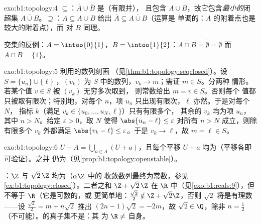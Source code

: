 \begin{solution}{exo:b1:topology:4}
$\subseteq$：$\overline A \cup \overline B$ 是（有限并），
且包含 $A \cup B$，故它包含\emph{最小的}闭
超集 $\overline{A \cup B}$。$\supseteq$：$A \subseteq A \cup B$
给出 $\overline A \subseteq \overline{A \cup B}$（运算是
单调的：$A$ 的附着点也是较大的附着点），而
对 $B$ 同理。

交集的反例：$A = \intoo{0}{1}$，$B =
\intoo{1}{2}$：$\overline{A \cap B} = \overline\emptyset = \emptyset$
而 $\overline A \cap \overline B = \{1\}$。
\end{solution}

\begin{solution}{exo:b1:topology:5}
利用的数列刻画
（见\cref{thm:b1:topology:seqclosed}）。设 $S = \{u_n\} \cup \{\ell\}$
，$(v_k)$ 为 $S$ 中的数列，$v_k \to m$；需证 $m \in S$。分两种
情形。若某个值 $v \in S$ 被 $(v_k)$ 无穷多次取到，
则常数给出 $m = v \in S$。否则每个
值都只被取有限次；特别地，对每个 $n$，项 $u_n$
只出现有限次，$\ell$ 亦然。于是对每个 $N$，
指标 $k$（满足 $v_k \in \{u_0, \dots, u_N, \ell\}$）只有有限多个，
其余的 $v_k$ 均为项 $u_n$，其中 $n > N$。给定
$\varepsilon > 0$，取 $N$ 使得 $\abs{u_n - \ell} \leq
\varepsilon$ 对所有 $n > N$ 成立，则除有限多个 $v_k$ 外都满足
$\abs{v_k - \ell} \leq \varepsilon$。于是 $v_k \to \ell$，故 $m =
\ell \in S$。
\end{solution}

\begin{solution}{exo:b1:topology:6}
$U + A = \bigcup_{a \in A} (U + a)$，且每个平移 $U + a$
均为（平移各即可验证）。之并
仍为（见\cref{prop:b1:topology:openstable}）。

：$\Z$ 与 $\sqrt 2\,\Z$ 均为（$\alpha\Z$ 中的
收敛数列最终为常数，参见
\cref{ex:b1:topology:closed}）。二者之和 $\Z + \sqrt 2\,\Z$ 在
$\R$ 中（见\cref{exo:b1:reals:9}），但不等于 $\R$（它是可数的，或
更简单地：$\frac{\sqrt 2}{2} \notin \Z + \sqrt2\Z$，否则 $\sqrt 2$
将是有理数——设 $\frac{\sqrt2}{2} = m + n\sqrt 2$
推出 $(2n - 1)\sqrt 2 = -2m$，故 $\sqrt 2 \in \Q$，除非 $n =
\frac12$（不可能）。的真子集不是：其
为 $\R \neq$ 自身。
\end{solution}

